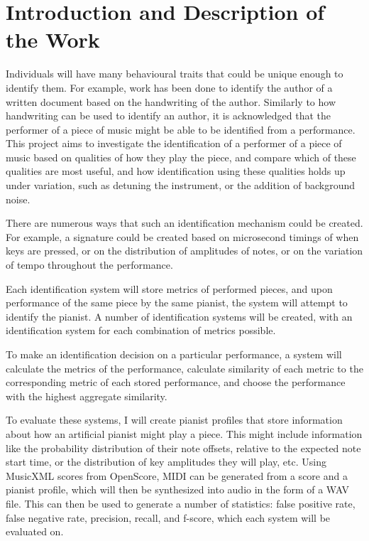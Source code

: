 \documentclass[12pt]{article}
\begin{document}

\section{Introduction and Description of the Work}

Individuals will have many behavioural traits that could be unique enough to identify them. For example, work has been done to identify the author of a written document based on the handwriting of the author. Similarly to how handwriting can be used to identify an author, it is acknowledged that the performer of a piece of music might be able to be identified from a performance. This project aims to investigate the identification of a performer of a piece of music based on qualities of how they play the piece, and compare which of these qualities are most useful, and how identification using these qualities holds up under variation, such as detuning the instrument, or the addition of background noise.

There are numerous ways that such an identification mechanism could be created. For example, a signature could be created based on microsecond timings of when keys are pressed, or on the distribution of amplitudes of notes, or on the variation of tempo throughout the performance.

Each identification system will store metrics of performed pieces, and upon performance of the same piece by the same pianist, the system will attempt to identify the pianist. A number of identification systems will be created, with an identification system for each combination of metrics possible.

To make an identification decision on a particular performance, a system will calculate the metrics of the performance, calculate similarity of each metric to the corresponding metric of each stored performance, and choose the performance with the highest aggregate similarity.

To evaluate these systems, I will create pianist profiles that store information about how an artificial pianist might play a piece. This might include information like the probability distribution of their note offsets, relative to the expected note start time, or the distribution of key amplitudes they will play, etc. Using MusicXML scores from OpenScore, MIDI can be generated from a score and a pianist profile, which will then be synthesized into audio in the form of a WAV file. This can then be used to generate a number of statistics: false positive rate, false negative rate, precision, recall, and f-score, which each system will be evaluated on.
\end{document}
